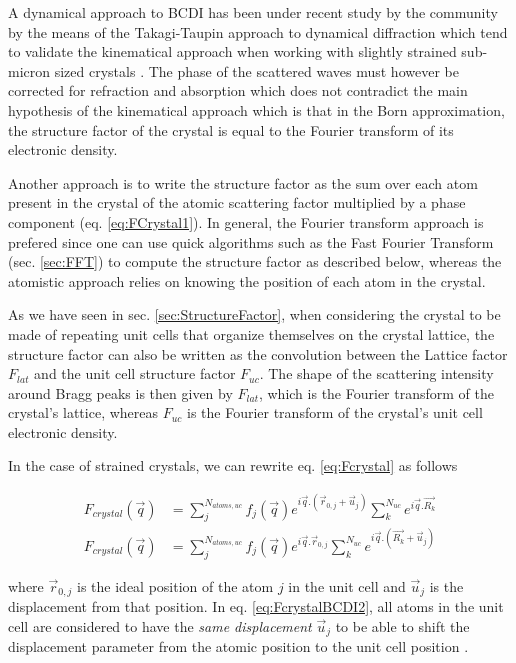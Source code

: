 A dynamical approach to BCDI has been under recent study by the community \parencite{Yan2014, Hu2018, Gao2022} by the means of the Takagi-Taupin approach to dynamical diffraction \parencite{Takagi1962, Takagi1969} which tend to validate the kinematical approach when working with slightly strained sub-micron sized crystals \parencite{Karpov2019, Barringer2021}.
The phase of the scattered waves must however be corrected for refraction and absorption \parencite{Harder2007, Gao2022} which does not contradict the main hypothesis of the kinematical approach which is that in the Born approximation,  the structure factor of the crystal is equal to the Fourier transform of its electronic density.

Another approach is to write the structure factor as the sum over each atom present in the crystal of the atomic scattering factor multiplied by a phase component (eq. \ref{eq:FCrystal1}).
In general, the Fourier transform approach is prefered since one can use quick algorithms such as the Fast Fourier Transform (sec. \ref{sec:FFT}) to compute the structure factor as described below, whereas the atomistic approach relies on knowing the position of each atom in the crystal.

As we have seen in sec. \ref{sec:StructureFactor}, when considering the crystal to be made of repeating unit cells that organize themselves on the crystal lattice, the structure factor can also be written as the convolution between the Lattice factor $F_{lat}$ and the unit cell structure factor $F_{uc}$.
The shape of the scattering intensity around Bragg peaks is then given by $F_{lat}$, which is the Fourier transform of the crystal's lattice, whereas $F_{uc}$ is the Fourier transform of the crystal's unit cell electronic density.

In the case of strained crystals, we can rewrite eq. \ref{eq:Fcrystal} as follows

\begin{align}
    \label{eq:FcrystalBCDI1}
    F_{crystal}(\vec{q}) & = \sum_j^{N_{atoms, uc}} f_j(\vec{q}) e^{i\vec{q}.(\vec{r}_{0,j} + \vec{u}_{j})} \sum_k^{N_{uc}} e^{i\vec{q}.\vec{R_k}}\\
    \label{eq:FcrystalBCDI2}
    F_{crystal}(\vec{q}) & = \sum_j^{N_{atoms, uc}} f_j(\vec{q}) e^{i\vec{q}.\vec{r}_{0,j}} \sum_k^{N_{uc}} e^{i\vec{q}.(\vec{R_k} + \vec{u}_{j})}
\end{align}

where $\vec{r}_{0,j}$ is the ideal position of the atom $j$ in the unit cell and $\vec{u}_{j}$ is the displacement from that position.
In eq. \ref{eq:FcrystalBCDI2}, all atoms in the unit cell are considered to have the \textit{same displacement} $\vec{u}_{j}$ to be able to shift the displacement parameter from the atomic position to the unit cell position \parencite{Karpov2019}.

